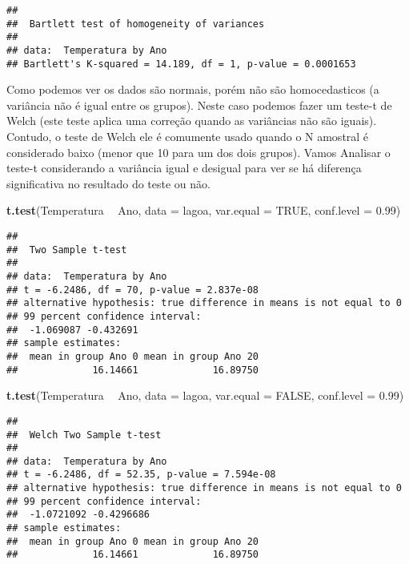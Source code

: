 \documentclass[]{book}
\newenvironment{Shaded}{\begin{snugshade}}{\end{snugshade}}
\newcommand{\DataTypeTok}[1]{\textcolor[rgb]{0.13,0.29,0.53}{#1}}
\newcommand{\FloatTok}[1]{\textcolor[rgb]{0.00,0.00,0.81}{#1}}
\newcommand{\KeywordTok}[1]{\textcolor[rgb]{0.13,0.29,0.53}{\textbf{#1}}}
\newcommand{\NormalTok}[1]{#1}
\newcommand{\OperatorTok}[1]{\textcolor[rgb]{0.81,0.36,0.00}{\textbf{#1}}}
\newcommand{\OtherTok}[1]{\textcolor[rgb]{0.56,0.35,0.01}{#1}}
\newcommand{\StringTok}[1]{\textcolor[rgb]{0.31,0.60,0.02}{#1}}
\begin{document}
\begin{verbatim}
## 
##  Bartlett test of homogeneity of variances
## 
## data:  Temperatura by Ano
## Bartlett's K-squared = 14.189, df = 1, p-value = 0.0001653
\end{verbatim}

Como podemos ver os dados são normais, porém não são homocedasticos (a variância não é igual entre os grupos). Neste caso podemos fazer um teste-t de Welch (este teste aplica uma correção quando as variâncias não são iguais). Contudo, o teste de Welch ele é comumente usado quando o N amostral é considerado baixo (menor que 10 para um dos dois grupos). Vamos Analisar o teste-t considerando a variância igual e desigual para ver se há diferença significativa no resultado do teste ou não.

\begin{Shaded}
\begin{Highlighting}[]
\KeywordTok{t.test}\NormalTok{(Temperatura }\OperatorTok{~}\StringTok{ }\NormalTok{Ano, }
       \DataTypeTok{data =}\NormalTok{ lagoa,}
       \DataTypeTok{var.equal =} \OtherTok{TRUE}\NormalTok{,}
       \DataTypeTok{conf.level =} \FloatTok{0.99}\NormalTok{)}
\end{Highlighting}
\end{Shaded}

\begin{verbatim}
## 
##  Two Sample t-test
## 
## data:  Temperatura by Ano
## t = -6.2486, df = 70, p-value = 2.837e-08
## alternative hypothesis: true difference in means is not equal to 0
## 99 percent confidence interval:
##  -1.069087 -0.432691
## sample estimates:
##  mean in group Ano 0 mean in group Ano 20 
##             16.14661             16.89750
\end{verbatim}

\begin{Shaded}
\begin{Highlighting}[]
\KeywordTok{t.test}\NormalTok{(Temperatura }\OperatorTok{~}\StringTok{ }\NormalTok{Ano, }
       \DataTypeTok{data =}\NormalTok{ lagoa,}
       \DataTypeTok{var.equal =} \OtherTok{FALSE}\NormalTok{,}
       \DataTypeTok{conf.level =} \FloatTok{0.99}\NormalTok{)}
\end{Highlighting}
\end{Shaded}

\begin{verbatim}
## 
##  Welch Two Sample t-test
## 
## data:  Temperatura by Ano
## t = -6.2486, df = 52.35, p-value = 7.594e-08
## alternative hypothesis: true difference in means is not equal to 0
## 99 percent confidence interval:
##  -1.0721092 -0.4296686
## sample estimates:
##  mean in group Ano 0 mean in group Ano 20 
##             16.14661             16.89750
\end{verbatim}
\end{document}
